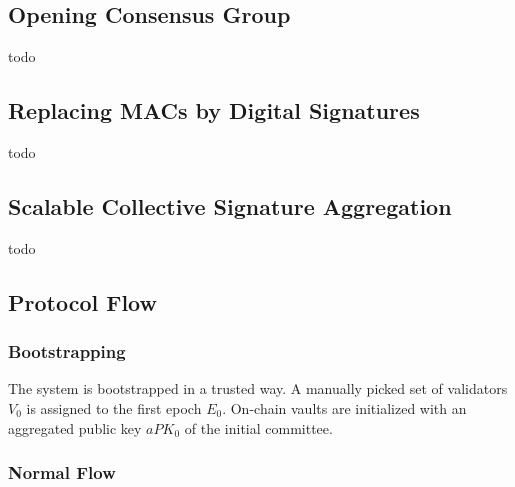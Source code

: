 \subsection{Opening Consensus Group}\label{subsec:opening-consensus-group}

todo

\subsection{Replacing MACs by Digital Signatures}\label{subsec:replacing-macs-by-digital-signatures}

todo

\subsection{Scalable Collective Signature Aggregation}\label{subsec:scalable-collective-signature-aggregation}

todo

\subsection{Protocol Flow}\label{subsec:protocol-flow}

\subsubsection{Bootstrapping}\label{subsubsec:bootstrapping}

The system is bootstrapped in a trusted way.
A manually picked set of validators $V_0$ is assigned to the first epoch $E_0$.
On-chain vaults are initialized with an aggregated public key $aPK_0$ of the initial committee.

\subsubsection{Normal Flow}\label{subsubsec:normal-flow}

